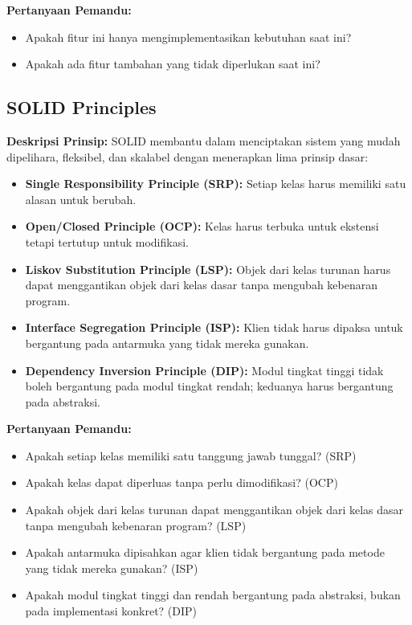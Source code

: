 \documentclass[12pt]{article}
\begin{document}
\textbf{Pertanyaan Pemandu:}
\begin{itemize}
    \item Apakah fitur ini hanya mengimplementasikan kebutuhan saat ini?
    \item Apakah ada fitur tambahan yang tidak diperlukan saat ini?
\end{itemize}

\subsection{SOLID Principles}
\textbf{Deskripsi Prinsip:} SOLID membantu dalam menciptakan sistem yang mudah dipelihara, fleksibel, dan skalabel dengan menerapkan lima prinsip dasar:
\begin{itemize}
    \item \textbf{Single Responsibility Principle (SRP):} Setiap kelas harus memiliki satu alasan untuk berubah.
    \item \textbf{Open/Closed Principle (OCP):} Kelas harus terbuka untuk ekstensi tetapi tertutup untuk modifikasi.
    \item \textbf{Liskov Substitution Principle (LSP):} Objek dari kelas turunan harus dapat menggantikan objek dari kelas dasar tanpa mengubah kebenaran program.
    \item \textbf{Interface Segregation Principle (ISP):} Klien tidak harus dipaksa untuk bergantung pada antarmuka yang tidak mereka gunakan.
    \item \textbf{Dependency Inversion Principle (DIP):} Modul tingkat tinggi tidak boleh bergantung pada modul tingkat rendah; keduanya harus bergantung pada abstraksi.
\end{itemize}

\textbf{Pertanyaan Pemandu:}
\begin{itemize}
    \item Apakah setiap kelas memiliki satu tanggung jawab tunggal? (SRP)
    \item Apakah kelas dapat diperluas tanpa perlu dimodifikasi? (OCP)
    \item Apakah objek dari kelas turunan dapat menggantikan objek dari kelas dasar tanpa mengubah kebenaran program? (LSP)
    \item Apakah antarmuka dipisahkan agar klien tidak bergantung pada metode yang tidak mereka gunakan? (ISP)
    \item Apakah modul tingkat tinggi dan rendah bergantung pada abstraksi, bukan pada implementasi konkret? (DIP)
\end{itemize}
\end{document}
